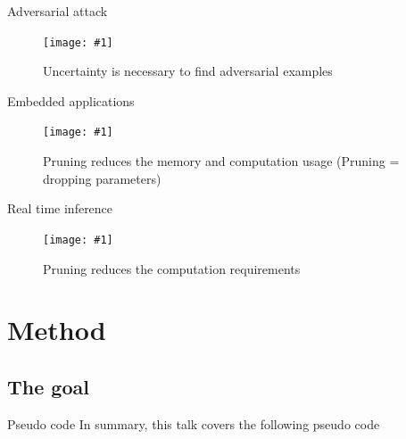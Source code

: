 \documentclass{beamer}
\newcommand{\fitfigure}[1]{\centering\texttt{[image: \#1]}}
\begin{document}
\begin{frame}{Adversarial attack}
	\begin{figure}
		\fitfigure{im/adversarial_attack.jpeg}
		\caption{Uncertainty is necessary to find adversarial examples}
	\end{figure}
\end{frame}

\begin{frame}{Embedded applications}
	\begin{figure}
		\fitfigure{im/raspberry_pi.jpg}
		\caption{Pruning reduces the memory and computation usage  (Pruning = dropping parameters)}
	\end{figure}
\end{frame}

\begin{frame}{Real time inference}
	\begin{figure}
		\fitfigure{im/real_time_inference.jpg}
		\caption{Pruning reduces the computation requirements}
	\end{figure}
\end{frame}



\section{Method}

\begin{frame}
	\centerline{  }
\end{frame}

\subsection{The goal}

\begin{frame}{Pseudo code}
	In summary, this talk covers the following pseudo code
	\centerline{  }
	
\end{frame}
\end{document}
